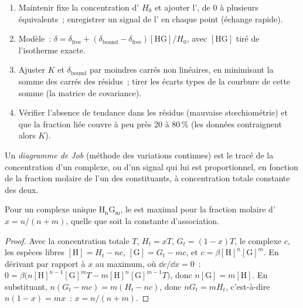 \begin{method}\label{met:b3:supramolecular:nmr-titration}
\begin{enumerate}
  \item Maintenir fixe la concentration d' $H_0$ et ajouter l',
        de 0 à plusieurs équivalents~; enregistrer un signal de l' en
        chaque point (échange rapide).
  \item Modèle~: $\delta = \delta_{\mathrm{free}} + (\delta_{\mathrm{bound}} - \delta_{\mathrm{free}})[\mathrm{HG}]/H_0$, avec $[\mathrm{HG}]$ tiré de l'isotherme exacte.
  \item Ajuster $K$ et $\delta_{\mathrm{bound}}$ par moindres carrés non linéaires, en minimisant la somme des carrés des
        résidus~; tirer les écarts types de la courbure de cette somme (la
        matrice de covariance).
  \item Vérifier l'absence de tendance dans les résidus (mauvaise
        stœchiométrie) et que la fraction liée couvre à peu près 20 à
        80\,\% (les données contraignent alors $K$).
\end{enumerate}
\end{method}

\begin{definition}\label{def:b3:supramolecular:job}
Un \emph{diagramme de Job} (méthode des variations
continues) est le tracé de la concentration d'un complexe, ou d'un signal
qui lui est proportionnel, en fonction de la fraction molaire de l'un des
constituants, à concentration totale constante des deux.
\end{definition}

\begin{proposition}\label{prop:b3:supramolecular:job}
Pour un complexe unique $\mathrm{H_nG_m}$, le  est maximal pour la fraction molaire d'
$x = n/(n + m)$, quelle que soit la constante d'association.
\end{proposition}

\begin{proof}
Avec la concentration totale $T$, $H_t = xT$, $G_t = (1 - x)T$, le complexe $c$, les espèces libres $[\mathrm H] = H_t - nc$,
$[\mathrm G] = G_t - mc$, et $c = \beta[\mathrm H]^n[\mathrm G]^m$. En dérivant par rapport à $x$ au maximum, où
$\dd c/\dd x = 0$~: $0 = \beta\bigl(n[\mathrm H]^{n-1}[\mathrm G]^m T - m[\mathrm H]^n[\mathrm G]^{m-1}T\bigr)$, donc $n[\mathrm G] = m[\mathrm H]$. En substituant,
$n(G_t - mc) = m(H_t - nc)$, donc $nG_t = mH_t$, c'est-à-dire $n(1 - x) = mx$~: $x = n/(n + m)$.
\end{proof}

